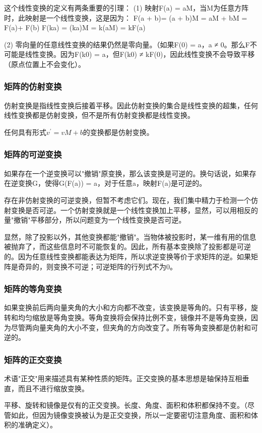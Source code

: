 这个线性变换的定义有两条重要的引理：
(1) 映射F(a) = aM，当M为任意方阵时，此映射是一个线性变换，这是因为：
F(a + b)= (a + b)M = aM + bM = F(a)+ F(b)
F(ka) = (ka)M = k(aM) = kF(a)

(2) 零向量的任意线性变换的结果仍然是零向量。（如果F(0) = a，a ≠ 0。那么F不可能是线性变换。因为F(k0) = a，但F(k0) ≠ kF(0)，因此线性变换不会导致平移（原点位置上不会变化）。

\subsubsection{矩阵的仿射变换}
仿射变换是指线性变换后接着平移。因此仿射变换的集合是线性变换的超集，任何线性变换都是仿射变换，但不是所有仿射变换都是线性变换。

任何具有形式$v^\prime = vM + b$的变换都是仿射变换。

\subsubsection{矩阵的可逆变换}
如果存在一个逆变换可以"撤销"原变换，那么该变换是可逆的。换句话说，如果存在逆变换G，使得G(F(a)) = a，对于任意a，映射F(a)是可逆的。

存在非仿射变换的可逆变换，但暂不考虑它们。现在，我们集中精力于检测一个仿射变换是否可逆。一个仿射变换就是一个线性变换加上平移，显然，可以用相反的量"撤销"平移部分，所以问题变为一个线性变换是否可逆。

显然，除了投影以外，其他变换都能"撤销"。当物体被投影时，某一维有用的信息被抛弃了，而这些信息时不可能恢复的。因此，所有基本变换除了投影都是可逆的。因为任意线性变换都能表达为矩阵，所以求逆变换等价于求矩阵的逆。如果矩阵是奇异的，则变换不可逆；可逆矩阵的行列式不为0。

\subsubsection{矩阵的等角变换}
如果变换前后两向量夹角的大小和方向都不改变，该变换是等角的。只有平移，旋转和均匀缩放是等角变换。等角变换将会保持比例不变，镜像并不是等角变换，因为尽管两向量夹角的大小不变，但夹角的方向改变了。所有等角变换都是仿射和可逆的。

\subsubsection{矩阵的正交变换}
术语"正交"用来描述具有某种性质的矩阵。正交变换的基本思想是轴保持互相垂直，而且不进行缩放变换。

平移、旋转和镜像是仅有的正交变换。长度、角度、面积和体积都保持不变。（尽管如此，但因为镜像变换被认为是正交变换，所以一定要密切注意角度、面积和体积的准确定义）。

